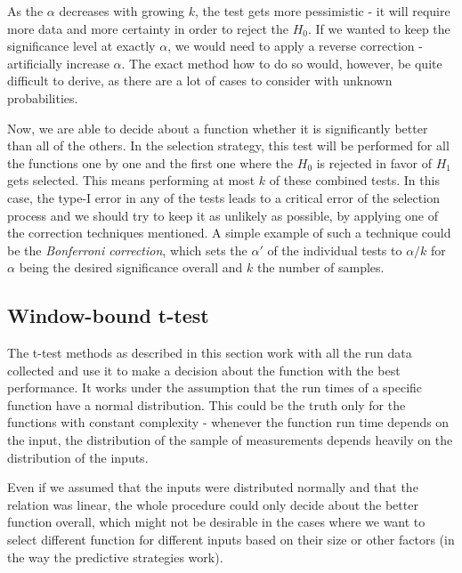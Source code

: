 As the $\alpha$ decreases with growing $k$, the test gets more pessimistic - it will require more data and more certainty in order to reject the $H_0$. If we wanted to keep the significance level at exactly $\alpha$, we would need to apply a reverse correction - artificially increase $\alpha$. The exact method how to do so would, however, be quite difficult to derive, as there are a lot of cases to consider with unknown probabilities. 

Now, we are able to decide about a function whether it is significantly better than all of the others. In the selection strategy, this test will be performed for all the functions one by one and the first one where the $H_0$ is rejected in favor of $H_1$ gets selected. This means performing at most $k$ of these combined tests. In this case, the type-I error in any of the tests leads to a critical error of the selection process and we should try to keep it as unlikely as possible, by applying one of the correction techniques mentioned. A simple example of such a technique could be the \textit{Bonferroni correction}, which sets the $\alpha'$ of the individual tests to $\alpha / k$ for $\alpha$ being the desired significance overall and $k$ the number of samples.

\subsection{Window-bound t-test}

The t-test methods as described in this section work with all the run data collected and use it to make a decision about the function with the best performance. It works under the assumption that the run times of a specific function have a normal distribution. This could be the truth only for the functions with constant complexity - whenever the function run time depends on the input, the distribution of the sample of measurements depends heavily on the distribution of the inputs.

Even if we assumed that the inputs were distributed normally and that the relation was linear, the whole procedure could only decide about the better function overall, which might not be desirable in the cases where we want to select different function for different inputs based on their size or other factors (in the way the predictive strategies work).

